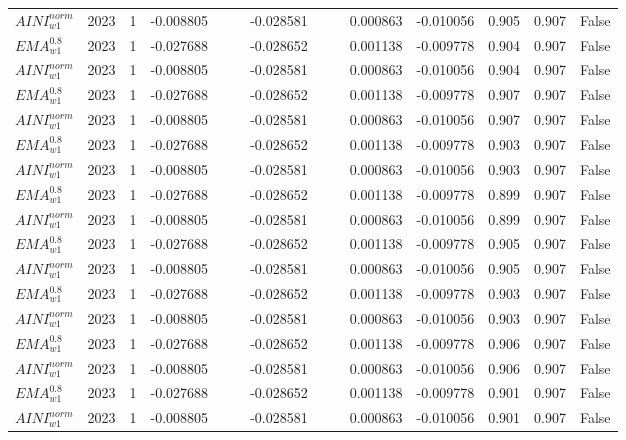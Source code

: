 \begin{tabular}{@{}llrrrrrrrrrlll@{}}
$AINI^{norm}_{w1}$ & 2023 & 1 & -0.008805 &  &  & -0.028581 &  &  & 0.000863 & -0.010056 & 0.905 & 0.907 & False \\
$EMA^{0.8}_{w1}$ & 2023 & 1 & -0.027688 &  &  & -0.028652 &  &  & 0.001138 & -0.009778 & 0.904 & 0.907 & False \\
$AINI^{norm}_{w1}$ & 2023 & 1 & -0.008805 &  &  & -0.028581 &  &  & 0.000863 & -0.010056 & 0.904 & 0.907 & False \\
$EMA^{0.8}_{w1}$ & 2023 & 1 & -0.027688 &  &  & -0.028652 &  &  & 0.001138 & -0.009778 & 0.907 & 0.907 & False \\
$AINI^{norm}_{w1}$ & 2023 & 1 & -0.008805 &  &  & -0.028581 &  &  & 0.000863 & -0.010056 & 0.907 & 0.907 & False \\
$EMA^{0.8}_{w1}$ & 2023 & 1 & -0.027688 &  &  & -0.028652 &  &  & 0.001138 & -0.009778 & 0.903 & 0.907 & False \\
$AINI^{norm}_{w1}$ & 2023 & 1 & -0.008805 &  &  & -0.028581 &  &  & 0.000863 & -0.010056 & 0.903 & 0.907 & False \\
$EMA^{0.8}_{w1}$ & 2023 & 1 & -0.027688 &  &  & -0.028652 &  &  & 0.001138 & -0.009778 & 0.899 & 0.907 & False \\
$AINI^{norm}_{w1}$ & 2023 & 1 & -0.008805 &  &  & -0.028581 &  &  & 0.000863 & -0.010056 & 0.899 & 0.907 & False \\
$EMA^{0.8}_{w1}$ & 2023 & 1 & -0.027688 &  &  & -0.028652 &  &  & 0.001138 & -0.009778 & 0.905 & 0.907 & False \\
$AINI^{norm}_{w1}$ & 2023 & 1 & -0.008805 &  &  & -0.028581 &  &  & 0.000863 & -0.010056 & 0.905 & 0.907 & False \\
$EMA^{0.8}_{w1}$ & 2023 & 1 & -0.027688 &  &  & -0.028652 &  &  & 0.001138 & -0.009778 & 0.903 & 0.907 & False \\
$AINI^{norm}_{w1}$ & 2023 & 1 & -0.008805 &  &  & -0.028581 &  &  & 0.000863 & -0.010056 & 0.903 & 0.907 & False \\
$EMA^{0.8}_{w1}$ & 2023 & 1 & -0.027688 &  &  & -0.028652 &  &  & 0.001138 & -0.009778 & 0.906 & 0.907 & False \\
$AINI^{norm}_{w1}$ & 2023 & 1 & -0.008805 &  &  & -0.028581 &  &  & 0.000863 & -0.010056 & 0.906 & 0.907 & False \\
$EMA^{0.8}_{w1}$ & 2023 & 1 & -0.027688 &  &  & -0.028652 &  &  & 0.001138 & -0.009778 & 0.901 & 0.907 & False \\
$AINI^{norm}_{w1}$ & 2023 & 1 & -0.008805 &  &  & -0.028581 &  &  & 0.000863 & -0.010056 & 0.901 & 0.907 & False \\

\end{tabular}
